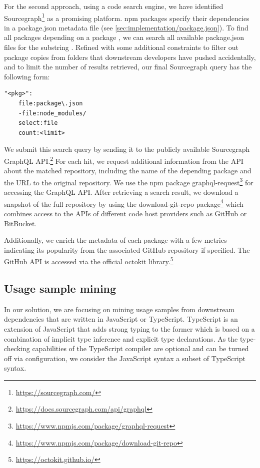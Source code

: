 For the second approach, using a code search engine, we have identified Sourcegraph\footnote{\url{https://sourcegraph.com/}} as a promising platform.
npm packages specify their dependencies in a package.json metadata file (see \cref{sec:implementation/package.json}).
To find all packages depending on a package , we can search all available package.json files for the substring .
Refined with some additional constraints to filter out package copies from  folders that downstream developers have pushed accidentally, and to limit the number of results retrieved, our final Sourcegraph query has the following form:

{
	\lstset{frame=none,
		aboveskip=3mm,
		belowskip=3mm,
		xleftmargin=3mm,
		xrightmargin=3mm
	}
	\begin{lstlisting}[language=sourcegraph]
"<pkg>":
	file:package\.json
	-file:node_modules/
	select:file
	count:<limit>
	\end{lstlisting}
}

We submit this search query by sending it to the publicly available Sourcegraph GraphQL API.\footnote{\url{https://docs.sourcegraph.com/api/graphql}}
For each hit, we request additional information from the API about the matched repository, including the name of the depending package and the URL to the original repository.
We use the npm package graphql-request\footnote{\url{https://www.npmjs.com/package/graphql-request}} for accessing the GraphQL API.
After retrieving a search result, we download a snapshot of the full repository by using the download-git-repo package\footnote{\url{https://www.npmjs.com/package/download-git-repo}} which combines access to the APIs of different code host providers such as GitHub or BitBucket.

Additionally, we enrich the metadata of each package with a few metrics indicating its popularity from the associated GitHub repository if specified.
The GitHub API is accessed via the official octokit library.\footnote{\url{https://octokit.github.io/}}

\subsection{Usage sample mining}
\label{sec:implementation/usage_mining}

In our solution, we are focusing on mining usage samples from downstream dependencies that are written in JavaScript or TypeScript.
TypeScript is an extension of JavaScript that adds strong typing to the former which is based on a combination of implicit type inference and explicit type declarations.
As the type-checking capabilities of the TypeScript compiler are optional and can be turned off via configuration, we consider the JavaScript syntax a subset of TypeScript syntax.

